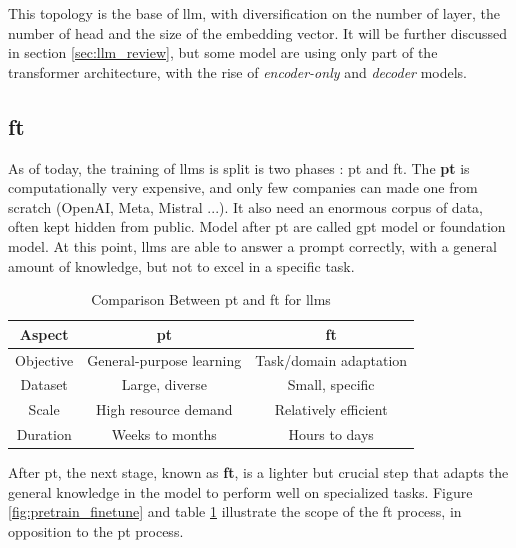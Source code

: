 This topology is the base of \acrshort{llm}, with diversification on the number of layer, the number of head and the size of the embedding vector. It will be further discussed in section \ref{sec:llm_review}, but some model are using only part of the \gls{transformer} architecture, with the rise of \textit{encoder-only} and \textit{\gls{decoder}} models.


\subsection{\Gls{ft}}
\label{sec:fine_tune}
As of today, the training of \glspl{llm} is split is two phases : \gls{pt} and \gls{ft}. The \textbf{\gls{pt}} is computationally very expensive, and only few companies can made one from scratch (OpenAI, Meta, Mistral ...). It also need an enormous corpus of data, often kept hidden from public. Model after \gls{pt} are called \gls{gpt} model or foundation model. At this point, \glspl{llm} are able to answer a prompt correctly, with a general amount of knowledge, but not to excel in a specific task.

\begin{table}[h!]
    \centering
    \begin{tabular}{|c|c|c|}
        \hline
        \textbf{Aspect} & \textbf{\Gls{pt}} & \textbf{\Gls{ft}} \\
        \hline
        Objective & General-purpose learning & Task/domain adaptation \\
        \hline
        Dataset & Large, diverse & Small, specific \\
        \hline
        Scale & High resource demand & Relatively efficient \\
        \hline
        Duration & Weeks to months & Hours to days \\
        \hline
    \end{tabular}
    \caption{Comparison Between \Gls{pt} and \Gls{ft} for \glspl{llm}}
    \label{tab:pretrain_vs_finetune}
\end{table}



After \gls{pt}, the next stage, known as \textbf{\Gls{ft}}, is a lighter but crucial step that adapts the general knowledge in the model to perform well on specialized tasks. Figure \ref{fig:pretrain_finetune} and table \ref{tab:pretrain_vs_finetune} illustrate the scope of the \gls{ft} process, in opposition to the \gls{pt} process.

